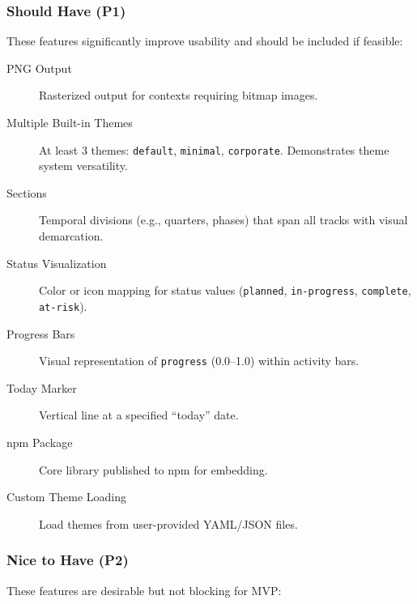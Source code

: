 \subsubsection{Should Have (P1)}

These features significantly improve usability and should be included if feasible:

\begin{description}
  \item[PNG Output] Rasterized output for contexts requiring bitmap images.
  
  \item[Multiple Built-in Themes] At least 3 themes: \texttt{default}, \texttt{minimal}, \texttt{corporate}. Demonstrates theme system versatility.
  
  \item[Sections] Temporal divisions (e.g., quarters, phases) that span all tracks with visual demarcation.
  
  \item[Status Visualization] Color or icon mapping for status values (\texttt{planned}, \texttt{in-progress}, \texttt{complete}, \texttt{at-risk}).
  
  \item[Progress Bars] Visual representation of \texttt{progress} (0.0–1.0) within activity bars.
  
  \item[Today Marker] Vertical line at a specified ``today'' date.
  
  \item[npm Package] Core library published to npm for embedding.
  
  \item[Custom Theme Loading] Load themes from user-provided YAML/JSON files.
\end{description}

\subsubsection{Nice to Have (P2)}

These features are desirable but not blocking for MVP:

